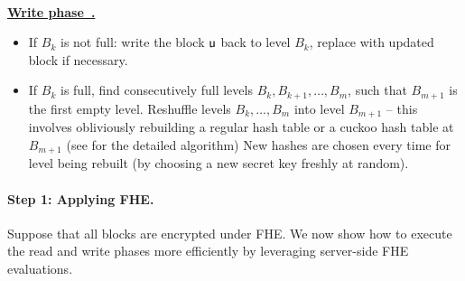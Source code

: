 \paragraph{}
\noindent\begin{boxedminipage}{\textwidth}
\underline{{\bf Write phase~\cite{oram09}.}}
\begin{itemize}
\item
If $B_k$ is not full: write the block $\textsf{u}$ back to level $B_k$,
replace with updated block if necessary.
\item
If $B_k$ is full, find consecutively full levels
$B_k, B_{k+1}, \ldots, B_{m}$, such that $B_{m+1}$ is the first
empty level.
Reshuffle levels $B_k, \ldots, B_m$ into level 
$B_{m+1}$ -- this involves obliviously rebuilding 
a regular hash table or 
a cuckoo hash table at $B_{m+1}$ (see \cite{oram09} for 
the detailed algorithm)
New hashes are chosen every time for 
level being rebuilt (by choosing a new secret key freshly at random).
\end{itemize}
\end{boxedminipage}

\paragraph{Step 1: Applying FHE.}
Suppose that all blocks are encrypted under FHE.
We now show how to execute the read and write phases more efficiently
by leveraging server-side FHE evaluations.

